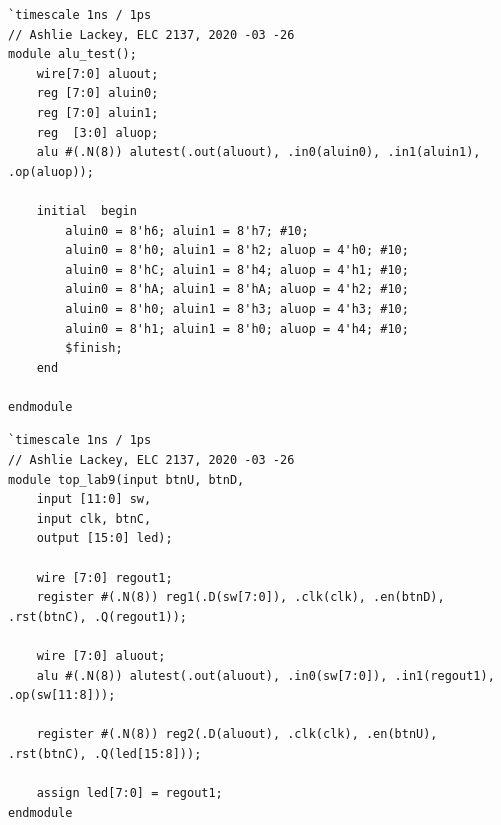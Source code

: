 \documentclass[11pt]{article}
\begin{document}
\begin{lstlisting}[style=Verilog,caption= ALU testbench Verilog Code,label=code:ex ]
`timescale 1ns / 1ps
// Ashlie Lackey, ELC 2137, 2020 -03 -26
module alu_test();
	wire[7:0] aluout;
	reg [7:0] aluin0;
	reg [7:0] aluin1; 
	reg  [3:0] aluop;
	alu #(.N(8)) alutest(.out(aluout), .in0(aluin0), .in1(aluin1), .op(aluop));
	
	initial  begin
		aluin0 = 8'h6; aluin1 = 8'h7; #10;
		aluin0 = 8'h0; aluin1 = 8'h2; aluop = 4'h0; #10;
		aluin0 = 8'hC; aluin1 = 8'h4; aluop = 4'h1; #10;
		aluin0 = 8'hA; aluin1 = 8'hA; aluop = 4'h2; #10;
		aluin0 = 8'h0; aluin1 = 8'h3; aluop = 4'h3; #10;
		aluin0 = 8'h1; aluin1 = 8'h0; aluop = 4'h4; #10; 
		$finish;
	end

endmodule
\end{lstlisting}

\begin{lstlisting}[style=Verilog,caption= top-lab9 Verilog Code,label=code:ex ]
`timescale 1ns / 1ps
// Ashlie Lackey, ELC 2137, 2020 -03 -26
module top_lab9(input btnU, btnD,
	input [11:0] sw,
	input clk, btnC,
	output [15:0] led);
	
	wire [7:0] regout1;
	register #(.N(8)) reg1(.D(sw[7:0]), .clk(clk), .en(btnD), .rst(btnC), .Q(regout1));
	
	wire [7:0] aluout;
	alu #(.N(8)) alutest(.out(aluout), .in0(sw[7:0]), .in1(regout1), .op(sw[11:8]));
	
	register #(.N(8)) reg2(.D(aluout), .clk(clk), .en(btnU), .rst(btnC), .Q(led[15:8]));
	
	assign led[7:0] = regout1;
endmodule
\end{lstlisting}
\end{document}
